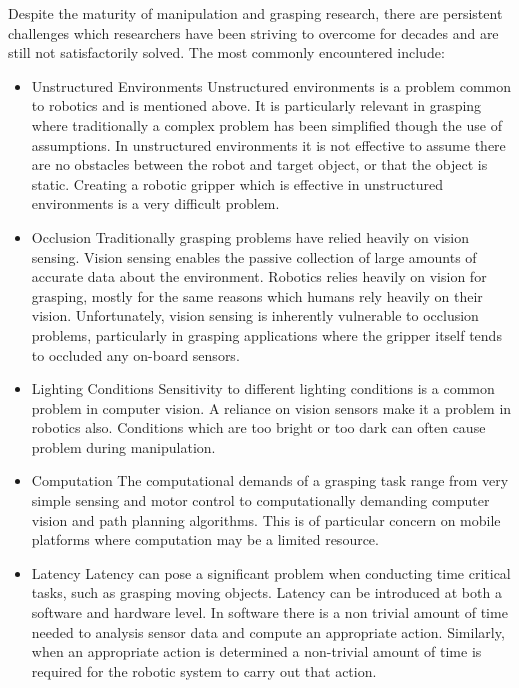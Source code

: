 Despite the maturity of manipulation and grasping research, there are persistent challenges which researchers have been striving to overcome for decades and are still not satisfactorily solved. The most commonly encountered include:
\begin{itemize}
    \item Unstructured Environments \cite{Delft, Zhao}
    Unstructured environments is a problem common to robotics and is mentioned above. It is particularly relevant in grasping where traditionally a complex problem has been simplified though the use of assumptions. In unstructured environments it is not effective to assume there are no obstacles between the robot and target object, or that the object is static. Creating a robotic gripper which is effective in unstructured environments is a very difficult problem.
    \item Occlusion \cite{Delft, Detectionandmapping, Zhao}
    Traditionally grasping problems have relied heavily on vision sensing. Vision sensing enables the passive collection of large amounts of accurate data about the environment. Robotics relies heavily on vision for grasping, mostly for the same reasons which humans rely heavily on their vision. Unfortunately, vision sensing is inherently vulnerable to occlusion problems, particularly in grasping applications where the gripper itself tends to occluded any on-board sensors.
    \item Lighting Conditions \cite{Delft, Detectionandmapping}
    Sensitivity to different lighting conditions is a common problem in computer vision. A reliance on vision sensors make it a problem in robotics also. Conditions which are too bright or too dark can often cause problem during manipulation.
    \item Computation
    The computational demands of a grasping task range from very simple sensing and motor control to computationally demanding computer vision and path planning algorithms. This is of particular concern on mobile platforms where computation may be a limited resource.
    \item Latency
    Latency can pose a significant problem when conducting time critical tasks, such as grasping moving objects. Latency can be introduced at both a software and hardware level. In software there is a non trivial amount of time needed to analysis sensor data and compute an appropriate action. Similarly, when an appropriate action is determined a non-trivial amount of time is required for the robotic system to carry out that action.
    
    
\end{itemize}


